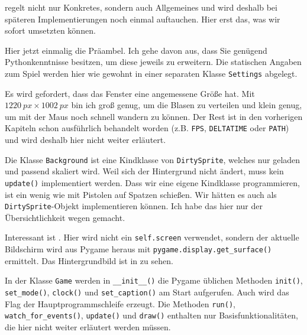  regelt nicht nur Konkretes, sondern auch Allgemeines und wird deshalb bei späteren Implementierungen noch einmal auftauchen. Hier erst das, was wir sofort umsetzten können.

Hier jetzt einmalig die Präambel. Ich gehe davon aus, dass Sie genügend Pythonkenntnisse besitzen, um diese jeweils zu erweitern. Die statischen Angaben zum Spiel werden hier wie gewohnt in einer separaten Klasse \texttt{Settings} abgelegt. 

Es wird gefordert, dass das Fenster eine angemessene Größe hat. Mit $1220~px \times 1002~px$ bin ich groß genug, um die Blasen zu verteilen und klein genug, um mit der Maus noch schnell wandern zu können. Der Rest ist in den vorherigen Kapiteln schon ausführlich behandelt worden (z.B. \texttt{FPS}, \texttt{DELTATIME} oder \texttt{PATH}) und wird deshalb hier nicht weiter erläutert.




Die Klasse \texttt{Background} ist eine Kindklasse von \texttt{DirtySprite}, welches nur geladen und passend skaliert wird. Weil sich der Hintergrund nicht ändert, muss kein \texttt{update()} implementiert werden. Dass wir eine eigene Kindklasse programmieren, ist ein wenig wie mit Pistolen auf Spatzen schießen. Wir hätten es auch als \texttt{DirtySprite}-Objekt implementieren können. Ich habe das hier nur der Übersichtlichkeit wegen gemacht. 

Interessant ist . Hier wird nicht ein \texttt{self.screen} verwendet, sondern der aktuelle Bildschirm wird aus Pygame heraus mit \texttt{pygame.display.get\_surface()} ermittelt. Das Hintergrundbild ist in  zu sehen.



In der Klasse \texttt{Game} werden in \texttt{\_\_init\_\_()} die Pygame üblichen Methoden \texttt{init()}, \texttt{set\_mode()}, \texttt{clock()} und \texttt{set\_caption()} am Start aufgerufen. Auch wird das Flag der Hauptprogrammschleife erzeugt. Die Methoden \texttt{run()}, \texttt{watch\_for\_events()}, \texttt{update()} und \texttt{draw()} enthalten nur Basisfunktionalitäten, die hier nicht weiter erläutert werden müssen. 

